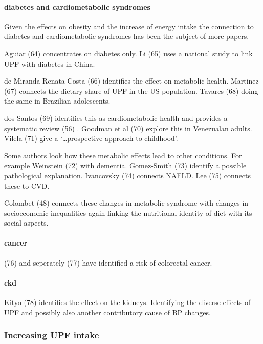 \documentclass[
]{article}
\begin{document}
\hypertarget{diabetes-and-cardiometabolic-syndromes}{%
\paragraph{diabetes and cardiometabolic
syndromes}\label{diabetes-and-cardiometabolic-syndromes}}

Given the effects on obesity and the increase of energy intake the
connection to diabetes and cardiometabolic syndromes has been the
subject of more papers.

Aguiar (64) concentrates on diabetes only. Li (65) uses a national study
to link UPF with diabetes in China.

de Miranda Renata Costa (66) identifies the effect on metabolic health.
Martinez (67) connects the dietary share of UPF in the US population.
Tavares (68) doing the same in Brazilian adolescents.

dos Santos (69) identifies this as cardiometabolic health and provides a
systematic review (56) . Goodman et al (70) explore this in Venezualan
adults. Vilela (71) give a `\ldots prospective approach to childhood'.

Some authors look how these metabolic effects lead to other conditions.
For example Weinstein (72) with dementia. Gomez-Smith (73) identify a
possible pathological explanation. Ivancovsky (74) connects NAFLD. Lee
(75) connects these to CVD.

Colombet (48) connects these changes in metabolic syndrome with changes
in socioeconomic inequalities again linking the nutritional identity of
diet with its social aspects.

\hypertarget{cancer}{%
\paragraph{cancer}\label{cancer}}

(76) and seperately (77) have identified a risk of colorectal cancer.

\hypertarget{ckd}{%
\paragraph{ckd}\label{ckd}}

Kityo (78) identifies the effect on the kidneys. Identifying the diverse
effects of UPF and possibly also another contributory cause of BP
changes.

\hypertarget{increasing-upf-intake}{%
\subsubsection{Increasing UPF intake}\label{increasing-upf-intake}}
\end{document}

